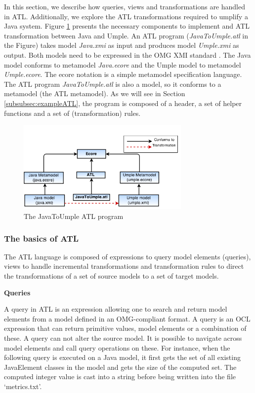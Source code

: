 In this section, we describe how queries, views and transformations are handled in ATL. Additionally, we explore the ATL transformations required to umplify a Java system. Figure \ref{fig:atl} presents the necessary components to implement and ATL transformation between Java and Umple. An ATL program (\textit{JavaToUmple.atl} in the Figure) takes model \textit{Java.xmi} as input and produces model \textit{Umple.xmi} as output. Both models need to be expressed in the OMG XMI standard \cite{xmispec}. The Java model conforms to metamodel \textit{Java.ecore} and the Umple model to metamodel \textit{Umple.ecore}. The ecore \cite{ecore} notation is a simple metamodel specification language. The ATL program \textit{JavaToUmple.atl} is also a model, so it conforms to a metamodel (the ATL metamodel). As we will see in Section \ref{subsubsec:exampleATL}, the program is composed of a header, a set of helper functions and a set of (transformation) rules.

\begin{figure}[h]
\centering
\includegraphics[width=0.75\textwidth]{Figures/ATL_PROGRAM.png} 
\caption{The JavaToUmple ATL program}
\label{fig:atl}
\end{figure}


\subsubsection{The basics of ATL}

The ATL language is composed of expressions to query model elements (queries), views to handle incremental transformations and transformation rules to direct the transformations of  a set of source models to a set of target models.

\textbf{Queries}

A query in ATL is an expression allowing one to search and return model elements from a model defined in an OMG-compliant format. A query is an OCL expression that can return primitive values, model elements or a combination of these. A query can not alter the source model. It is possible to navigate across model elements and call query operations on these. For instance, when the following query is executed on a Java model, it first gets the set of all existing JavaElement classes in the model and gets the size of the computed set. The computed integer value is cast into a string before being written into the file `metrics.txt'. 


